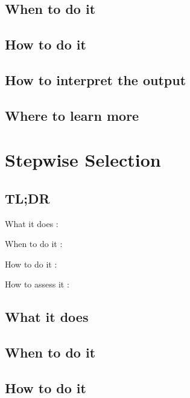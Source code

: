 \documentclass[
]{book}
\begin{document}
\hypertarget{when-to-do-it-11}{%
\section{When to do it}\label{when-to-do-it-11}}

\hypertarget{how-to-do-it-11}{%
\section{How to do it}\label{how-to-do-it-11}}

\hypertarget{how-to-interpret-the-output-11}{%
\section{How to interpret the output}\label{how-to-interpret-the-output-11}}

\hypertarget{where-to-learn-more-11}{%
\section{Where to learn more}\label{where-to-learn-more-11}}

\hypertarget{stepwise-selection}{%
\chapter{Stepwise Selection}\label{stepwise-selection}}

\hypertarget{tldr-12}{%
\section{TL;DR}\label{tldr-12}}

What it does
:

When to do it
:

How to do it
:

How to assess it
:

\hypertarget{what-it-does-12}{%
\section{What it does}\label{what-it-does-12}}

\hypertarget{when-to-do-it-12}{%
\section{When to do it}\label{when-to-do-it-12}}

\hypertarget{how-to-do-it-12}{%
\section{How to do it}\label{how-to-do-it-12}}
\end{document}
